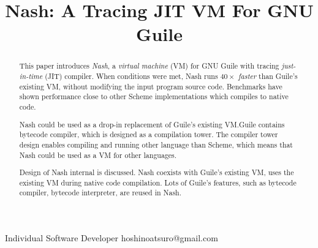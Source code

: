 \documentclass[preprint]{sigplanconf}
\begin{document}
\setlength{\pdfpageheight}{\paperheight}
\setlength{\pdfpagewidth}{\paperwidth}




\title{Nash: A Tracing JIT VM For GNU Guile}

           {Individual Software Developer}
           {hoshinoatsuro@gmail.com}

\maketitle

\begin{abstract}

This paper introduces \textit{Nash}, a \textit{virtual machine} (VM) for GNU
Guile with tracing \textit{just-in-time} (JIT) compiler. When conditions were
met, Nash runs \textit{$40\times$ faster} than Guile's existing VM, without
modifying the input program source code. Benchmarks have shown performance
close to other Scheme implementations which compiles to native code.

Nash could be used as a drop-in replacement of Guile's existing VM.\@ Guile
contains bytecode compiler, which is designed as a compilation tower. The
compiler tower design enables compiling and running other language than
Scheme, which means that Nash could be used as a VM for other languages.

Design of Nash internal is discussed. Nash coexists with Guile's existing VM,
uses the existing VM during native code compilation. Lots of Guile's features,
such as bytecode compiler, bytecode interpreter, are reused in Nash.

\end{abstract}
\end{document}
